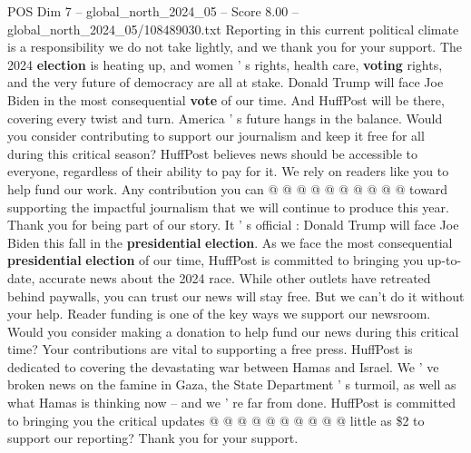 \begin{textsample}{POS Dim 7 – global\_north\_2024\_05 – Score 8.00 – global\_north\_2024\_05/108489030.txt}
Reporting in this current political climate is a responsibility we do not take lightly, and we thank you for your support.
The 2024 \textbf{election} is heating up, and women ' s rights, health care, \textbf{voting} rights, and the very future of democracy are all at stake.
Donald Trump will face Joe Biden in the most consequential \textbf{vote} of our time.
And HuffPost will be there, covering every twist and turn.
America ' s future hangs in the balance.
Would you consider contributing to support our journalism and keep it free for all during this critical season?
HuffPost believes news should be accessible to everyone, regardless of their ability to pay for it.
We rely on readers like you to help fund our work.
Any contribution you can @ @ @ @ @ @ @ @ @ @ toward supporting the impactful journalism that we will continue to produce this year.
Thank you for being part of our story.
It ' s official : Donald Trump will face Joe Biden this fall in the \textbf{presidential} \textbf{election}.
As we face the most consequential \textbf{presidential} \textbf{election} of our time, HuffPost is committed to bringing you up-to-date, accurate news about the 2024 race.
While other outlets have retreated behind paywalls, you can trust our news will stay free.
But we can't do it without your help.
Reader funding is one of the key ways we support our newsroom.
Would you consider making a donation to help fund our news during this critical time?
Your contributions are vital to supporting a free press.
HuffPost is dedicated to covering the devastating war between Hamas and Israel.
We ' ve broken news on the famine in Gaza, the State Department ' s turmoil, as well as what Hamas is thinking now -- and we ' re far from done.
HuffPost is committed to bringing you the critical updates @ @ @ @ @ @ @ @ @ @ little as \$2 to support our reporting?
Thank you for your support.

\end{textsample}
